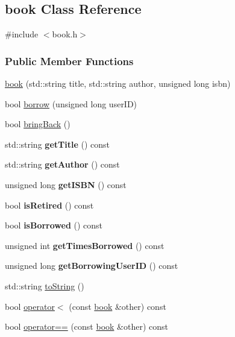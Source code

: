 \hypertarget{classbook}{}\subsection{book Class Reference}
\label{classbook}


{\ttfamily \#include $<$book.\+h$>$}

\subsubsection*{Public Member Functions}
\begin{DoxyCompactItemize}
\item 
\hyperlink{classbook_a5114952cb9ce13311c70a7da4a84f65e}{book} (std\+::string title, std\+::string author, unsigned long isbn)
\item 
bool \hyperlink{classbook_a25a20807ec84c3dd73a2633a4765d1bf}{borrow} (unsigned long user\+ID)
\item 
bool \hyperlink{classbook_a0db6fec61d11dfb27f20403569289bbb}{bring\+Back} ()
\item 
\mbox{\label{classbook_a467791863f6159f6e2cd5ae1486d3f6d}} 
std\+::string {\bfseries get\+Title} () const
\item 
\mbox{\label{classbook_a760484e4bc14cb11cec145739747f22a}} 
std\+::string {\bfseries get\+Author} () const
\item 
\mbox{\label{classbook_a5838258e345c651f1cb899417f56a1e7}} 
unsigned long {\bfseries get\+I\+S\+BN} () const
\item 
\mbox{\label{classbook_ae4499dba0f39ea4136d670d298bf56af}} 
bool {\bfseries is\+Retired} () const
\item 
\mbox{\label{classbook_aa76dd75565c10ec36c0f4649341b4fa1}} 
bool {\bfseries is\+Borrowed} () const
\item 
\mbox{\label{classbook_a58f5e200f3433fec3536a0d1c47df6ba}} 
unsigned int {\bfseries get\+Times\+Borrowed} () const
\item 
\mbox{\label{classbook_a2667d5ddba56407c1439128ed2d3add2}} 
unsigned long {\bfseries get\+Borrowing\+User\+ID} () const
\item 
std\+::string \hyperlink{classbook_ac673df10b3812cf593f02a7c9967a947}{to\+String} ()
\item 
bool \hyperlink{classbook_a373aa61d941709b14481d3515cc229fe}{operator$<$} (const \hyperlink{classbook}{book} \&other) const
\item 
bool \hyperlink{classbook_a6b9ded1510aa5ca62f00f5cbc650200e}{operator==} (const \hyperlink{classbook}{book} \&other) const
\end{DoxyCompactItemize}


